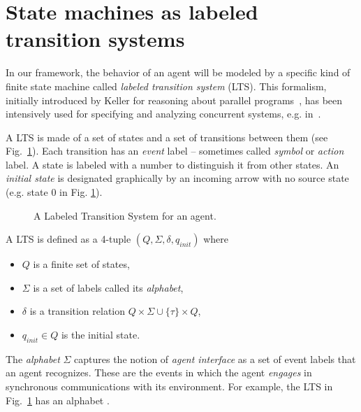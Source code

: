 \section{State machines as labeled transition systems\label{section:background-state-machines}}

In our framework, the behavior of an agent will be modeled by a specific kind of finite state machine called \emph{labeled transition system} (LTS). This formalism, initially introduced by Keller for reasoning about parallel programs~\cite{Keller:1976}, has been intensively used for specifying and analyzing concurrent systems, e.g. in~\cite{Milner:1989, Clarke:1989, Magee:1997}. 

A LTS is made of a set of states and a set of transitions between them (see Fig.~\ref{image:framework-start-stop}). Each transition has an \emph{event} label -- sometimes called \emph{symbol} or \emph{action} label. A state is labeled with a number to distinguish it from other states. An \emph{initial state} is designated graphically by an incoming arrow with no source state (e.g. state 0 in Fig. \ref{image:framework-start-stop}). 

\begin{figure}
\centering{}
  \caption[A Labeled Transition System for an Engine agent]{A Labeled Transition System for an  agent\label{image:framework-start-stop}.}
\end{figure}

\begin{definition}
A LTS is defined as a 4-tuple $(Q,\Sigma,\delta,q_{init})$ where
\begin{itemize}
\item $Q$ is a finite set of states,
\item $\Sigma$ is a set of labels called its \emph{alphabet}, 
\item $\delta$ is a transition relation $Q \times \Sigma\cup\{\tau\} \times Q$,
\item $q_{init} \in Q$ is the initial state. 
\end{itemize}
\end{definition}

The \emph{alphabet} $\Sigma$ captures the notion of \emph{agent interface} as a set of event labels that an agent recognizes. These are the events in which the agent \emph{engages} in synchronous communications with its environment. For example, the LTS in Fig.~\ref{image:framework-start-stop} has an alphabet . 

